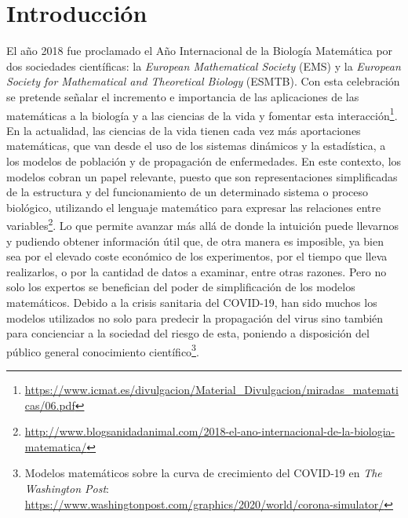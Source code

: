 \chapter{Introducción}
\label{cap:introduccion}


El año 2018 fue proclamado el Año Internacional de la Biología Matemática por dos sociedades científicas: la \textit{European Mathematical Society} (EMS) y la \textit{European Society for Mathematical and Theoretical Biology} (ESMTB). Con esta celebración se pretende señalar el incremento e importancia de las aplicaciones de las matemáticas a la biología y a las ciencias de la vida y fomentar esta interacción\footnote{\url{https://www.icmat.es/divulgacion/Material_Divulgacion/miradas_matematicas/06.pdf}}. En la actualidad, las ciencias de la vida tienen cada vez más aportaciones matemáticas, que van desde el uso de los sistemas dinámicos y la estadística, a los modelos de población y de propagación de enfermedades. En este contexto, los modelos cobran un papel relevante, puesto que son representaciones simplificadas de la estructura y del funcionamiento de un determinado sistema o proceso biológico, utilizando el lenguaje matemático para expresar las relaciones entre variables\footnote{\url{http://www.blogsanidadanimal.com/2018-el-ano-internacional-de-la-biologia-matematica/}}. Lo que permite avanzar más allá de donde la intuición puede llevarnos y pudiendo obtener información útil que, de otra manera es imposible, ya bien sea por el elevado coste económico de los experimentos, por el tiempo que lleva realizarlos, o por la cantidad de datos a examinar, entre otras razones. Pero no solo los expertos se benefician del poder de simplificación de los modelos matemáticos. Debido a la crisis sanitaria del COVID-19, han sido muchos los modelos utilizados no solo para predecir la propagación del virus sino también para concienciar a la sociedad del riesgo de esta, poniendo a disposición del público general conocimiento científico\footnote{Modelos matemáticos sobre la curva de crecimiento del COVID-19 en \textit{The Washington Post}: \url{https://www.washingtonpost.com/graphics/2020/world/corona-simulator/}}. 



